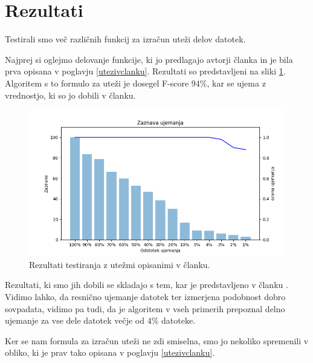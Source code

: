 \documentclass{acm_proc_article-sp}
\begin{document}
\section{Rezultati}
Testirali smo več različnih funkcij za izračun uteži delov datotek.

Najprej si oglejmo delovanje funkcije, ki jo predlagajo avtorji članka \cite{fbhash} in je bila prva opisana v poglavju \ref{utezivclanku}. Rezultati so predstavljeni na sliki \ref{fig:clanekUtezi}. Algoritem s to formulo za uteži je dosegel F-score 94\%, kar se ujema z vrednostjo, ki so jo dobili v članku.
\begin{figure}[htb]
\begin{center}
\includegraphics[width=1\columnwidth]{njihov_majhen.png}
\end{center}
\caption{\small{Rezultati testiranja z utežmi opisanimi v članku.}}
\label{fig:clanekUtezi}
\end{figure}

Rezultati, ki smo jih dobili se skladajo s tem, kar je predstavljeno v članku \cite{fbhash}. Vidimo lahko, da resnično ujemanje datotek ter izmerjena podobnost dobro sovpadata, vidimo pa tudi, da je algoritem v vseh primerih prepoznal delno ujemanje za vse dele datotek večje od 4\% datoteke.

Ker se nam formula za izračun uteži ne zdi smiselna, smo jo nekoliko spremenili v obliko, ki je prav tako opisana v poglavju \ref{utezivclanku}.
\end{document}
